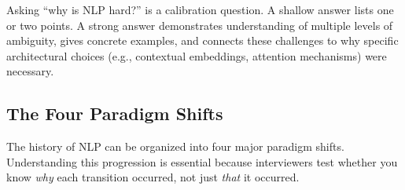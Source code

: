 \begin{keyinsight}
Asking ``why is NLP hard?'' is a calibration question. A shallow answer lists one or two
points. A strong answer demonstrates understanding of multiple levels of ambiguity, gives
concrete examples, and connects these challenges to why specific architectural choices
(e.g., contextual embeddings, attention mechanisms) were necessary.
\end{keyinsight}

\subsection{The Four Paradigm Shifts}
\label{sec:paradigm_shifts}

The history of NLP can be organized into four major paradigm shifts. Understanding this
progression is essential because interviewers test whether you know \emph{why} each
transition occurred, not just \emph{that} it occurred.

